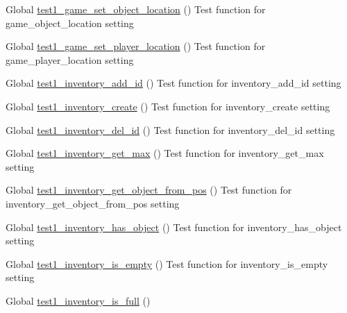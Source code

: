 \begin{DoxyRefList}
\item[Global \mbox{\hyperlink{game__test_8c_a467fe2bad25b7d53fa51ad3901f4672f}{test1\+\_\+game\+\_\+set\+\_\+object\+\_\+location}} ()]\label{test__test000039}%
%
Test function for game\+\_\+object\+\_\+location setting  
\item[Global \mbox{\hyperlink{game__test_8c_a11eedf3d88f649f9f208861d318f893d}{test1\+\_\+game\+\_\+set\+\_\+player\+\_\+location}} ()]\label{test__test000037}%
%
Test function for game\+\_\+player\+\_\+location setting  
\item[Global \mbox{\hyperlink{inventory__test_8c_a40a21fc4411716ecfa2bbb33c783df94}{test1\+\_\+inventory\+\_\+add\+\_\+id}} ()]\label{test__test000057}%
%
Test function for inventory\+\_\+add\+\_\+id setting  
\item[Global \mbox{\hyperlink{inventory__test_8c_a33638f1a88ae16ab8d6bee00145b82b8}{test1\+\_\+inventory\+\_\+create}} ()]\label{test__test000053}%
%
Test function for inventory\+\_\+create setting  
\item[Global \mbox{\hyperlink{inventory__test_8c_a155511682587d9cd63fbd2b62c74dffe}{test1\+\_\+inventory\+\_\+del\+\_\+id}} ()]\label{test__test000059}%
%
Test function for inventory\+\_\+del\+\_\+id setting  
\item[Global \mbox{\hyperlink{inventory__test_8c_a17c03f02b989bb00b04155c12fe2af9d}{test1\+\_\+inventory\+\_\+get\+\_\+max}} ()]\label{test__test000063}%
%
Test function for inventory\+\_\+get\+\_\+max setting  
\item[Global \mbox{\hyperlink{inventory__test_8c_abc494d6faa726bd3769d8231ed953bc4}{test1\+\_\+inventory\+\_\+get\+\_\+object\+\_\+from\+\_\+pos}} ()]\label{test__test000055}%
%
Test function for inventory\+\_\+get\+\_\+object\+\_\+from\+\_\+pos setting  
\item[Global \mbox{\hyperlink{inventory__test_8c_a998808342b6ea7d9e7c12c47c4725093}{test1\+\_\+inventory\+\_\+has\+\_\+object}} ()]\label{test__test000071}%
%
Test function for inventory\+\_\+has\+\_\+object setting  
\item[Global \mbox{\hyperlink{inventory__test_8c_afe8c9730e30b58535afc0481970ab2b1}{test1\+\_\+inventory\+\_\+is\+\_\+empty}} ()]\label{test__test000067}%
%
Test function for inventory\+\_\+is\+\_\+empty setting  
\item[Global \mbox{\hyperlink{inventory__test_8c_a7eb3ba387e33c42ff45331c9d9aada34}{test1\+\_\+inventory\+\_\+is\+\_\+full}} ()]\label{test__test000065}%

\end{DoxyRefList}
